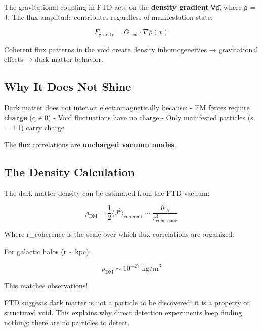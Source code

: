\documentclass[
  11pt,
  letterpaper,
  twoside,
  openright]{book}
\begin{document}
The gravitational coupling in FTD acts on the \textbf{density gradient}
∇ρ̄, where ρ = \textbar J\textbar. The flux amplitude contributes
regardless of manifestation state:

\[F_{\text{gravity}} = G_{\text{bias}} \cdot \nabla\bar{\rho}(x)\]

Coherent flux patterns in the void create density inhomogeneities →
gravitational effects → dark matter behavior.

\subsection{Why It Does Not Shine}\label{why-it-does-not-shine}

Dark matter does not interact electromagnetically because: - EM forces
require \textbf{charge} (q ≠ 0) - Void fluctuations have no charge -
Only manifested particles (s = ±1) carry charge

The flux correlations are \textbf{uncharged vacuum modes}.

\subsection{The Density Calculation}\label{the-density-calculation}

The dark matter density can be estimated from the FTD vacuum:

\[\rho_{\text{DM}} = \frac{1}{2} \langle J^2 \rangle_{\text{coherent}} \sim \frac{K_B}{r_{\text{coherence}}^3}\]

Where r\_coherence is the scale over which flux correlations are
organized.

For galactic halos (r \textasciitilde{} kpc):

\[\rho_{\text{DM}} \sim 10^{-27} \text{ kg/m}^3\]

This matches observations!

\begin{tcolorbox}[enhanced jigsaw, leftrule=.75mm, title=\textcolor{quarto-callout-important-color}{\faExclamation}\hspace{0.5em}{A New Paradigm}, bottomrule=.15mm, opacityback=0, coltitle=black, arc=.35mm, colframe=quarto-callout-important-color-frame, colbacktitle=quarto-callout-important-color!10!white, colback=white, titlerule=0mm, breakable, bottomtitle=1mm, toptitle=1mm, rightrule=.15mm, toprule=.15mm, left=2mm, opacitybacktitle=0.6]

FTD suggests dark matter is not a particle to be discovered: it is a
property of structured void. This explains why direct detection
experiments keep finding nothing: there are no particles to detect.

\end{tcolorbox}
\end{document}
